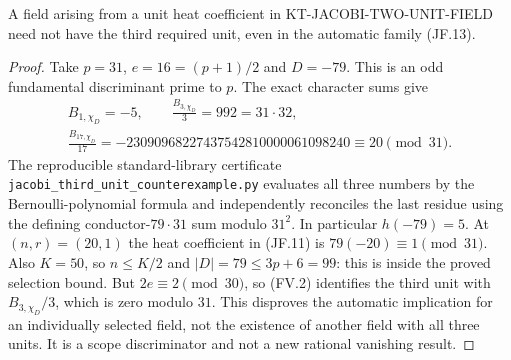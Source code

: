 \begin{proposition}
A field arising from a unit heat coefficient in
KT-JACOBI-TWO-UNIT-FIELD need not have the third required unit,
even in the automatic family (JF.13).
\end{proposition}
\begin{proof}
Take $p=31$, $e=16=(p+1)/2$ and $D=-79$.  This is an odd
fundamental discriminant prime to $p$.  The exact character sums give
\[
\begin{gathered}
 B_{1,\chi_D}=-5,\qquad
 \frac{B_{3,\chi_D}}3=992=31\cdot32,\\
 \frac{B_{17,\chi_D}}{17}
       =-23090968227437542810000061098240
       \equiv20\pmod{31}.
\end{gathered}
\]
The reproducible standard-library certificate
\texttt{jacobi\_third\_unit\_counterexample.py} evaluates all three
numbers by the Bernoulli-polynomial formula and independently
reconciles the last residue using the defining conductor-$79\cdot31$
sum modulo $31^2$.  In particular $h(-79)=5$.
At $(n,r)=(20,1)$ the heat coefficient in (JF.11) is
$79(-20)\equiv1\pmod{31}$.  Also $K=50$, so $n\leq K/2$
and $|D|=79\leq3p+6=99$: this is inside the proved selection bound.
But $2e\equiv2\pmod{30}$, so (FV.2) identifies the third unit
with $B_{3,\chi_D}/3$, which is zero modulo $31$.
This disproves the automatic implication for an individually selected
field, not the existence of another field with all three units.
It is a scope discriminator and not a new rational vanishing result.
\end{proof}
